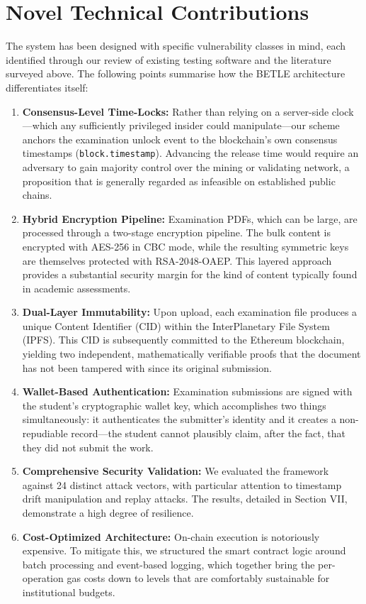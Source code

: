 \documentclass[final,5p,times]{elsarticle}
\begin{document}
\section{Novel Technical Contributions}
The system has been designed with specific vulnerability classes in mind, each identified through our review of existing testing software and the literature surveyed above. The following points summarise how the BETLE architecture differentiates itself:
\begin{enumerate}
    \item \textbf{Consensus-Level Time-Locks:} Rather than relying on a server-side clock—which any sufficiently privileged insider could manipulate—our scheme anchors the examination unlock event to the blockchain's own consensus timestamps (\texttt{block.timestamp}). Advancing the release time would require an adversary to gain majority control over the mining or validating network, a proposition that is generally regarded as infeasible on established public chains.
    \item \textbf{Hybrid Encryption Pipeline:} Examination PDFs, which can be large, are processed through a two-stage encryption pipeline. The bulk content is encrypted with AES-256 in CBC mode, while the resulting symmetric keys are themselves protected with RSA-2048-OAEP. This layered approach provides a substantial security margin for the kind of content typically found in academic assessments.
    \item \textbf{Dual-Layer Immutability:} Upon upload, each examination file produces a unique Content Identifier (CID) within the InterPlanetary File System (IPFS). This CID is subsequently committed to the Ethereum blockchain, yielding two independent, mathematically verifiable proofs that the document has not been tampered with since its original submission.
    \item \textbf{Wallet-Based Authentication:} Examination submissions are signed with the student's cryptographic wallet key, which accomplishes two things simultaneously: it authenticates the submitter's identity and it creates a non-repudiable record—the student cannot plausibly claim, after the fact, that they did not submit the work.
    \item \textbf{Comprehensive Security Validation:} We evaluated the framework against 24 distinct attack vectors, with particular attention to timestamp drift manipulation and replay attacks. The results, detailed in Section VII, demonstrate a high degree of resilience.
    \item \textbf{Cost-Optimized Architecture:} On-chain execution is notoriously expensive. To mitigate this, we structured the smart contract logic around batch processing and event-based logging, which together bring the per-operation gas costs down to levels that are comfortably sustainable for institutional budgets.
\end{enumerate}
\end{document}
